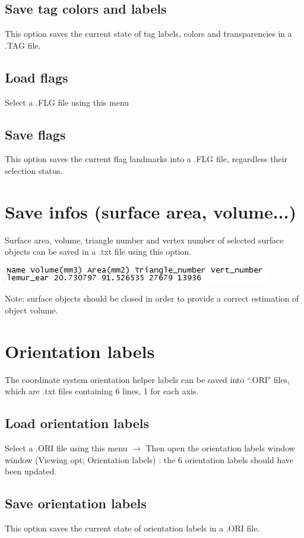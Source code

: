 \subsection{Save tag colors and labels}
This option saves the current state of tag labels, colors and transparencies in a .TAG file.

\subsection{Load flags}
Select a .FLG file using this menu

\subsection{Save flags}
This option saves the current flag landmarks into a .FLG file, regardless their selection status.

\section{Save infos (surface area, volume...)}
\noindent
\begin{minipage}{0.55\textwidth}

Surface area, volume, triangle number and
vertex number of selected surface objects can be
saved in a .txt file using this option.
\end{minipage}  
 \begin{minipage}{0.45\textwidth}\centering
  \includegraphics[scale=0.4]{images/File/Infos.png}
 \end{minipage} 
\noindent

Note: surface objects should be closed in order to provide a correct estimation of object volume.
\section{Orientation labels}
The coordinate system orientation helper labels can be saved into ``.ORI" files, which are .txt files
containing 6 lines, 1 for each axis.


\subsection{Load orientation labels}
Select a .ORI file using this menu $\rightarrow$ Then open the orientation labels window window (Viewing opt;
Orientation labels) : the 6 orientation labels should have been updated.

\subsection{Save orientation labels}
This option saves the current state of orientation labels in a .ORI file.

